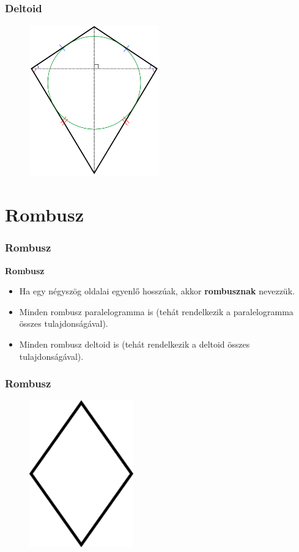 \documentclass[11pt]{beamer}
\begin{document}
\begin{frame}
\frametitle{Deltoid}
\begin{figure}
  \includegraphics[width=0.5\textwidth]{deltoid.png}
\end{figure}
\end{frame}

\section{\textbf{Rombusz}}
\begin{frame}[<+->]
\frametitle{Rombusz}
\begin{block}{\textbf{Rombusz}}
\begin{itemize}[label=$\circ$]
\item Ha egy négyszög oldalai egyenlő hosszúak, akkor \textbf{rombusznak} nevezzük.
\item Minden rombusz paralelogramma is (tehát rendelkezik a paralelogramma összes tulajdonságával).
\item Minden rombusz deltoid is (tehát rendelkezik a deltoid összes tulajdonságával).
\end{itemize}
\end{block}
\end{frame}

\begin{frame}
\frametitle{Rombusz}
\begin{figure}
  \includegraphics[width=0.4\textwidth]{rhombus.png}
\end{figure}
\end{frame}
\end{document}
